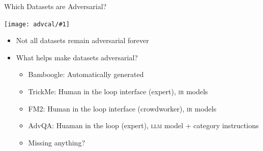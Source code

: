 \documentclass[compress]{beamer}
\newcommand{\abr}[1]{\textsc{#1} }
\newcommand{\gfxa}[2]{
	\begin{center}
		\texttt{[image: advcal/\#1]}
	\end{center}
}
\begin{document}

\begin{frame}{Which Datasets are Adversarial?}
	\gfxa{cumulative_advscore}{.9}
	
	\begin{itemize}
		\item Not all datasets remain adversarial forever
		\item What helps make datasets adversarial?
		\begin{itemize}
			\item Bamboogle: Automatically generated          
			\item TrickMe: Human in the loop interface (expert), \abr{ir} models
			\item FM2: Human in the loop interface (crowdworker), \abr{ir} models
			\item AdvQA: Huaman in the loop (expert), \abr{llm} model + category instructions
			\pause
			\item Missing anything?
		\end{itemize}
		
	\end{itemize}
\end{frame}
\fi
\end{document}

